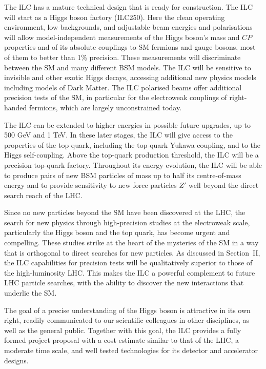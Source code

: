 \documentclass[%
reprint,
 floatfix,
 amsmath,amssymb,
 aps,
]{revtex4-1}
\newcommand{\todo}[1]{\textcolor{red}{{#1}}}
\begin{document}

The ILC has a mature technical design
that is
 ready for construction. The ILC will start as a Higgs boson factory
 (ILC250).  Here the clean operating environment, low backgrounds, and
adjustable beam energies and polarisations will allow
model-independent 
measurements of the Higgs boson's mass and  $CP$ properties and of its
absolute couplings to SM fermions and gauge bosons, 
most of them to better than 1\% precision.  These measurements will
discriminate between the SM and many different BSM models.
The ILC will be sensitive to invisible and other exotic Higgs decays,
accessing additional new physics models including models of Dark
Matter.   The ILC polarised beams offer additional precision tests of
the SM, in particular for the electroweak couplings of right-handed
fermions, 
which are largely unconstrained today.


The ILC can be extended to higher energies in possible future
upgrades, up to 500 GeV and 1 TeV.  In these later stages, 
the ILC will give access to the properties of the top quark,
 including the top-quark Yukawa coupling, and  to the Higgs self-coupling.
Above  the top-quark production threshold,  the ILC will be
 a precision top-quark factory. Throughout its energy evolution,  the
 ILC will be able to produce pairs of new BSM particles of mass 
up to half its centre-of-mass energy and to  provide
 sensitivity to new force particles $Z'$ well beyond the direct search reach of the LHC.

Since no new particles beyond the SM have been 
discovered at the LHC, the search for new physics through
high-precision studies at the electroweak scale, particularly the Higgs boson and  the top quark, has
become
 urgent and compelling.  These studies strike at the heart of the
 mysteries of the SM in a way that is orthogonal to 
 direct searches for new particles.
 As discussed in Section~II, the ILC capabilities 
for precision tests
will be qualitatively superior  to those of the high-luminosity LHC. 
 This makes the ILC a powerful complement to  future LHC
 particle searches, with the ability to discover the new interactions that underlie the
 SM. 
 
The goal of a precise understanding of the Higgs boson is attractive
in its own right, readily communicated to our scientific
colleagues in other disciplines, as well as the general public.  Together
with this goal, the ILC provides a fully formed project proposal
with a  cost estimate
 similar to that of the LHC, a moderate time scale, and well tested
 technologies for its 
detector and accelerator designs. 
\end{document}
